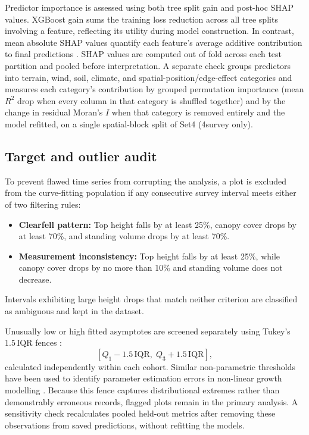 Predictor importance is assessed using both tree split gain and post-hoc SHAP values. XGBoost gain sums the training loss reduction across all tree splits involving a feature, reflecting its utility during model construction. In contrast, mean absolute SHAP values quantify each feature's average additive contribution to final predictions \cite{lundberg2017unified}. SHAP values are computed out of fold across each test partition and pooled before interpretation. A separate check groups predictors into terrain, wind, soil, climate, and spatial-position/edge-effect categories and measures each category's contribution by grouped permutation importance (mean $R^2$ drop when every column in that category is shuffled together) and by the change in residual Moran's $I$ when that category is removed entirely and the model refitted, on a single spatial-block split of Set4 (4survey only).

\subsection*{Target and outlier audit}
To prevent flawed time series from corrupting the analysis, a plot is excluded from the curve-fitting population if any consecutive survey interval meets either of two filtering rules:
\begin{itemize}
\setlength\itemsep{2pt}
\item \textbf{Clearfell pattern:} Top height falls by at least 25\%, canopy cover drops by at least 70\%, and standing volume drops by at least 70\%.
\item \textbf{Measurement inconsistency:} Top height falls by at least 25\%, while canopy cover drops by no more than 10\% and standing volume does not decrease.
\end{itemize}
Intervals exhibiting large height drops that match neither criterion are classified as ambiguous and kept in the dataset.

Unusually low or high fitted asymptotes are screened separately using Tukey's $1.5\,\mathrm{IQR}$ fences \cite{tukey1977Exploratory}:
\begin{equation}
\left[Q_1 - 1.5\,\mathrm{IQR},\; Q_3 + 1.5\,\mathrm{IQR}\right],
\label{eq:tukey-fences}
\end{equation}
calculated independently within each cohort. Similar non-parametric thresholds have been used to identify parameter estimation errors in non-linear growth modelling \cite{markovic2014NewApproach}. Because this fence captures distributional extremes rather than demonstrably erroneous records, flagged plots remain in the primary analysis. A sensitivity check recalculates pooled held-out metrics after removing these observations from saved predictions, without refitting the models.

